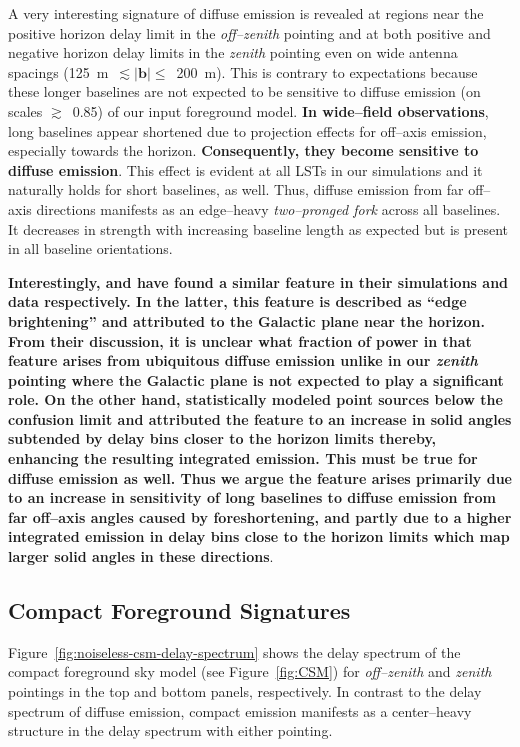 \documentclass[preprint2,iop,numberedappendix]{emulateapj}
\begin{document}
A very interesting signature of diffuse emission is revealed at regions near the positive horizon delay limit in the {\it off--zenith} pointing and at both positive and negative horizon delay limits in the {\it zenith} pointing even on wide antenna spacings (125~m~$\lesssim |\boldsymbol{b}|\le$~200~m). This is contrary to expectations because these longer baselines are not expected to be sensitive to diffuse emission (on scales $\gtrsim$~0.85\arcdeg) of our input foreground model. {\bf In wide--field observations}, long baselines appear shortened due to projection effects for off--axis emission, especially towards the horizon. {\bf Consequently, they become sensitive to diffuse emission}. This effect is evident at all LSTs in our simulations and it naturally holds for short baselines, as well. Thus, diffuse emission from far off--axis directions manifests as an edge--heavy {\it two--pronged fork} across all baselines. It decreases in strength with increasing baseline length as expected but is present in all baseline orientations.   

{\bf Interestingly, \citet{thy13} and \citet{pob13} have found a similar feature in their simulations and data respectively. In the latter, this feature is described as ``edge brightening'' and attributed to the Galactic plane near the horizon. From their discussion, it is unclear what fraction of power in that feature arises from ubiquitous diffuse emission unlike in our {\it zenith} pointing where the Galactic plane is not expected to play a significant role. On the other hand, \citet{thy13} statistically modeled point sources below the confusion limit and attributed the feature to an increase in solid angles subtended by delay bins closer to the horizon limits thereby, enhancing the resulting integrated emission. This must be true for diffuse emission as well. Thus we argue the feature arises primarily due to an increase in sensitivity of long baselines to diffuse emission from far off--axis angles caused by foreshortening, and partly due to a higher integrated emission in delay bins close to the horizon limits which map larger solid angles in these directions}. 

\subsection{Compact Foreground Signatures}\label{sec:compact}

Figure~\ref{fig:noiseless-csm-delay-spectrum} shows the delay spectrum of the compact foreground sky model (see Figure~\ref{fig:CSM}) for {\it off--zenith} and {\it zenith} pointings in the top and bottom panels, respectively. In contrast to the delay spectrum of diffuse emission, compact emission manifests as a center--heavy structure in the delay spectrum with either pointing. 
\end{document}
